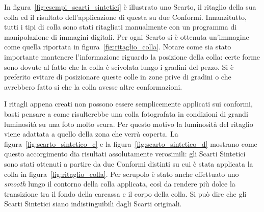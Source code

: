 In figura~\ref{fig:esempi_scarti_sintetici} è illustrato uno Scarto, il ritaglio della sua colla ed il risultato dell'applicazione di questa su due Conformi.
Innanzitutto, tutti i tipi di colla sono stati ritagliati manualmente con un programma di manipolazione di immagini digitali.
Per ogni Scarto si è ottenuta un'immagine come quella riportata in figura~\ref{fig:ritaglio_colla}.
Notare come sia stato importante mantenere l'informazione riguardo la posizione della colla:
certe forme sono dovute al fatto che la colla è scivolata lungo i gradini del pezzo.
Si è preferito evitare di posizionare queste colle in zone prive di gradini o che avrebbero fatto si che la colla avesse altre conformazioni. %

I ritagli appena creati non possono essere semplicemente applicati  sui conformi, basti pensare a come risulterebbe una colla fotografata in condizioni di grandi luminosità su una foto molto scura.
Per questo motivo la luminosità del ritaglio viene adattata a quello della zona che verrà coperta.
La figura~\ref{fig:scarto_sintetico_c} e la figura~\ref{fig:scarto_sintetico_d} mostrano come questo accorgimento dia risultati assolutamente verosimili: gli Scarti Sintetici sono stati ottenuti a partire da due Conformi distinti su cui è stata applicata la colla in figura~\ref{fig:ritaglio_colla}.
Per scrupolo è stato anche effettuato uno \textit{smooth} lungo il contorno della colla applicata, così da rendere più dolce la transizione tra il fondo della carcassa e il corpo della colla.
Si può dire che gli Scarti Sintetici siano indistinguibili dagli Scarti originali.



